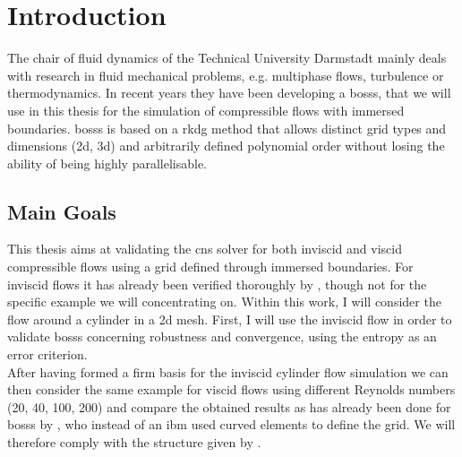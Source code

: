 \chapter{Introduction}
The chair of fluid dynamics of the Technical University Darmstadt mainly deals with research in fluid mechanical problems, e.g. multiphase flows, turbulence or thermodynamics. In recent years they have been developing a \gls{bosss}, that we will use in this thesis for the simulation of compressible flows with immersed boundaries. \gls{bosss} is based on a \gls{rkdg} method that allows  distinct grid types and dimensions (\gls{2d}, \gls{3d}) and arbitrarily defined polynomial order without losing the ability of being highly parallelisable. 

\section{Main Goals}

This thesis aims at validating the \gls{cns} solver for both inviscid and viscid compressible flows using a grid defined through immersed boundaries. For inviscid flows it has already been verified thoroughly by \textcite{mueller2014}, though not for the specific example we will concentrating on. 
Within this work, I will consider the flow around a cylinder in a \gls{2d} mesh. First, I will use the inviscid flow in order to validate \gls{bosss} concerning robustness and convergence, using the entropy as an error criterion. \\ \indent
After having formed a firm basis for the inviscid cylinder flow simulation we can then consider the same example for viscid flows using different Reynolds numbers (20, 40, 100, 200) and compare the obtained results as has already been done for \gls{bosss} by \textcite{ayers}, who instead of an \gls{ibm} used curved elements to define the grid. We will therefore comply with the structure given by \textcite{ayers}.



